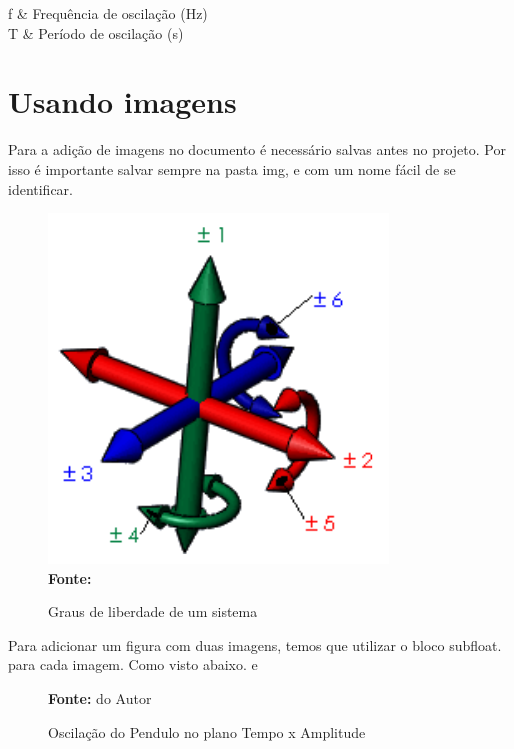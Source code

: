 \begin{conditions*}
 f  &  Frequência de oscilação (Hz)\\
 T  &  Período de oscilação (s)
\end{conditions*}


\section{Usando imagens}

Para a adição de imagens no documento é necessário salvas antes no projeto. Por isso é importante salvar sempre na pasta img, e com um nome fácil de se identificar.

\begin{figure} [H]
    \vspace{1.0em}
    \centering%
    \caption{Graus de liberdade de um sistema}%
    \includegraphics[width=.25\textwidth]{../img/graus_liberdade_solidworks.png}%
    \\\hspace{\linewidth}%
    \textbf{Fonte:} \cite{solidWorks} %
    \label{fig:graus_liberdade} 
    \vspace{1.0em}
\end{figure}

Para adicionar um figura com duas imagens, temos que utilizar o bloco subfloat. para cada imagem. Como visto abaixo. e 
 
\begin{figure}[H]
    \vspace{1.0em}
    \centering
    \caption{Oscilação do Pendulo no plano Tempo x Amplitude}
    \hspace{\linewidth}%
    \textbf{Fonte:} do Autor%
    \label{fig:cefets}
    \vspace{1.0em}
\end{figure}


